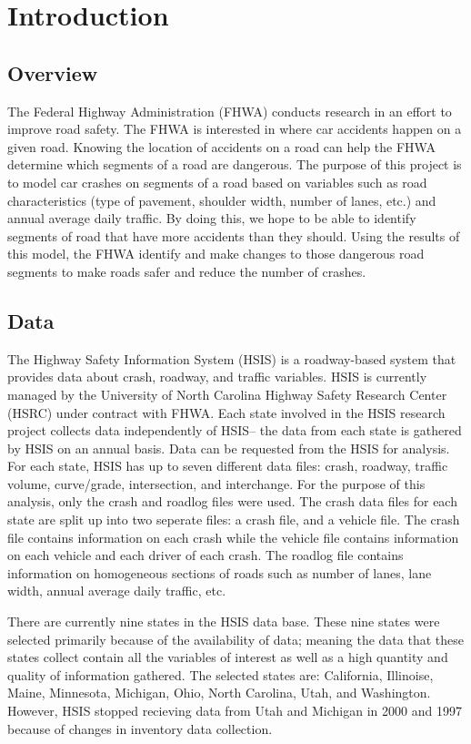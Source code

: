 
\chapter{Introduction}

\section{Overview}

The Federal Highway Administration (FHWA) conducts research in an effort to improve road safety. The FHWA is interested in where car accidents happen on a given road. Knowing the location of accidents on a road can help the FHWA determine which segments of a road are dangerous. The purpose of this project is to model car crashes on segments of a road based on variables such as road characteristics (type of pavement, shoulder width, number of lanes, etc.) and annual average daily traffic. By doing this, we hope to be able to identify segments of road that have more accidents than they should.  Using the results of this model, the FHWA identify and make changes to those dangerous road segments to make roads safer and reduce the number of crashes.

\section{Data}

The Highway Safety Information System (HSIS) is a roadway-based system that provides data about crash, roadway, and traffic variables. HSIS is currently managed by the University of North Carolina Highway Safety Research Center (HSRC) under contract with FHWA. Each state involved in the HSIS research project collects data independently of HSIS-- the data from each state is gathered by HSIS on an annual basis. Data can be requested from the HSIS for analysis. For each state, HSIS has up to seven different data files: crash, roadway, traffic volume, curve/grade, intersection, and interchange. For the purpose of this analysis, only the crash and roadlog files were used. The crash data files for each state are split up into two seperate files: a crash file, and a vehicle file. The crash file contains information on each crash while the vehicle file contains information on each vehicle and each driver of each crash. The roadlog file contains information on homogeneous sections of roads such as number of lanes, lane width, annual average daily traffic, etc.


There are currently nine states in the HSIS data base. These nine states were selected primarily because of the availability of data; meaning the data that these states collect contain all the variables of interest as well as a high quantity and quality of information gathered. The selected states are: California, Illinoise, Maine, Minnesota, Michigan, Ohio, North Carolina, Utah, and Washington. However, HSIS stopped recieving data from Utah and Michigan in 2000 and 1997 because of changes in inventory data collection.

